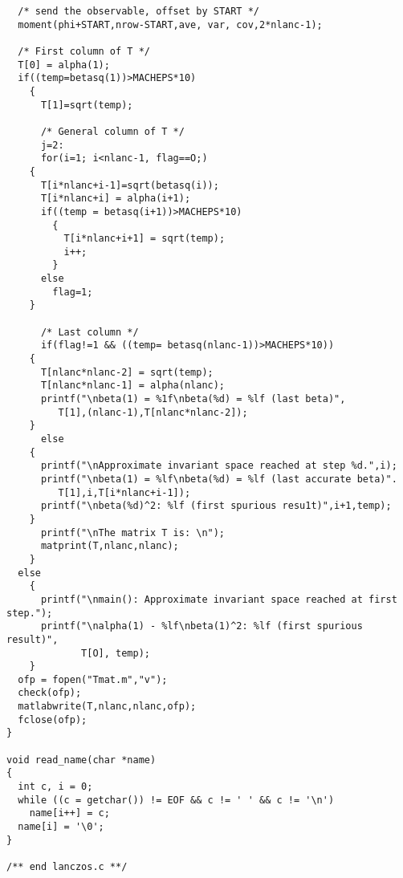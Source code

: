 {\begin{verbatim}
  /* send the observable, offset by START */
  moment(phi+START,nrow-START,ave, var, cov,2*nlanc-1);

  /* First column of T */
  T[0] = alpha(1);
  if((temp=betasq(1))>MACHEPS*10)
    {
      T[1]=sqrt(temp);

      /* General column of T */
      j=2:
      for(i=1; i<nlanc-1, flag==O;)
	{
	  T[i*nlanc+i-1]=sqrt(betasq(i));
	  T[i*nlanc+i] = alpha(i+1);
	  if((temp = betasq(i+1))>MACHEPS*10)
	    {
	      T[i*nlanc+i+1] = sqrt(temp);
	      i++;
	    }
	  else
	    flag=1;
	}

      /* Last column */
      if(flag!=1 && ((temp= betasq(nlanc-1))>MACHEPS*10))
	{
	  T[nlanc*nlanc-2] = sqrt(temp);
	  T[nlanc*nlanc-1] = alpha(nlanc);
	  printf("\nbeta(1) = %1f\nbeta(%d) = %lf (last beta)",
		 T[1],(nlanc-1),T[nlanc*nlanc-2]);
	}
      else
	{
	  printf("\nApproximate invariant space reached at step %d.",i);
	  printf("\nbeta(1) = %lf\nbeta(%d) = %lf (last accurate beta)".
		 T[1],i,T[i*nlanc+i-1]);
	  printf("\nbeta(%d)^2: %lf (first spurious resu1t)",i+1,temp);
	}
      printf("\nThe matrix T is: \n");
      matprint(T,nlanc,nlanc);
    }
  else
    {
      printf("\nmain(): Approximate invariant space reached at first step.");
      printf("\nalpha(1) - %lf\nbeta(1)^2: %lf (first spurious result)", 
             T[O], temp);
    }
  ofp = fopen("Tmat.m","v");
  check(ofp);
  matlabwrite(T,nlanc,nlanc,ofp);
  fclose(ofp);
}

void read_name(char *name)
{
  int c, i = 0;
  while ((c = getchar()) != EOF && c != ' ' && c != '\n')
    name[i++] = c;
  name[i] = '\0';
}

/** end lanczos.c **/


\end{verbatim}}

\vskip2cm


